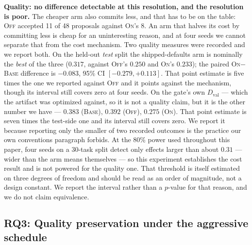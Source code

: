 \documentclass{article}
\newcommand{\Dval}{D_{\mathrm{val}}}
\begin{document}
\textbf{Quality: no difference detectable at this resolution, and the resolution is poor.} The cheaper arm also commits less, and that has to be on the table: \textsc{Off} accepted 11 of 48 proposals against \textsc{On}'s 8. An arm that halves its cost by committing less is cheap for an uninteresting reason, and at four seeds we cannot separate that from the cost mechanism. Two quality measures were recorded and we report both. On the held-out \emph{test} split the shipped-defaults arm is nominally the \emph{best} of the three ($0.317$, against \textsc{Off}'s $0.250$ and \textsc{On}'s $0.233$); the paired \textsc{On}${-}$\textsc{Base} difference is $-0.083$, 95\% CI $[-0.279, +0.113]$. That point estimate is five times the one we reported against \textsc{Off} and it points against the mechanism, though its interval still covers zero at four seeds. On the gate's own $\Dval$ --- which the artifact was optimized against, so it is not a quality claim, but it is the other number we have --- $0.383$ (\textsc{Base}), $0.392$ (\textsc{Off}), $0.275$ (\textsc{On}). That point estimate is seven times the test-side one and its interval still covers zero. We report it because reporting only the smaller of two recorded outcomes is the practice our own conventions paragraph forbids. At the 80\% power used throughout this paper, four seeds on a 30-task split detect only effects larger than about $0.31$ --- wider than the arm means themselves --- so this experiment establishes the cost result and is not powered for the quality one. That threshold is itself estimated on three degrees of freedom and should be read as an order of magnitude, not a design constant. We report the interval rather than a $p$-value for that reason, and we do not claim equivalence.

\subsection{RQ3: Quality preservation under the aggressive schedule}
\label{sec:exp-ports}
\end{document}

